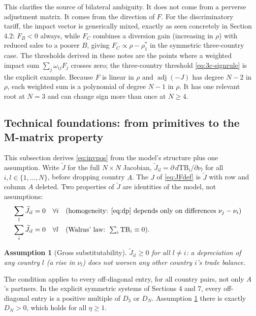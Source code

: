 \documentclass[11pt]{article}
\newtheorem{assumption}{Assumption}
\begin{document}
This clarifies the source of bilateral ambiguity. It does not come from a perverse adjustment matrix. It comes from the direction of $F$. For the discriminatory tariff, the impact vector is generically mixed, exactly as seen concretely in Section 4.2: $F_B < 0$ always, while $F_C$ combines a diversion gain (increasing in $\rho$) with reduced sales to a poorer $B$, giving $F_C \propto \rho - \rho_1^*$ in the symmetric three-country case. The thresholds derived in these notes are the points where a weighted impact sum $\sum_j \omega_{ij} F_j$ crosses zero; the three-country threshold \eqref{eq:3c-signrule} is the explicit example. Because $F$ is linear in $\rho$ and $\operatorname{adj}(-J)$ has degree $N-2$ in $\rho$, each weighted sum is a polynomial of degree $N-1$ in $\rho$. It has one relevant root at $N = 3$ and can change sign more than once at $N \geq 4$.

\subsection{Technical foundations: from primitives to the M-matrix property}

This subsection derives \eqref{eq:invpos} from the model's structure plus one assumption. Write $\widetilde J$ for the full $N \times N$ Jacobian, $\widetilde J_{il} = \partial\, d\mathrm{TB}_i / \partial \nu_l$ for all $i, l \in \{1, \dots, N\}$, before dropping country $A$. The $J$ of \eqref{eq:JFdef} is $\widetilde J$ with row and column $A$ deleted. Two properties of $\widetilde J$ are identities of the model, not assumptions:
\begin{align}
\sum_{l} \widetilde J_{il} &= 0 \quad \forall i
&& \text{(homogeneity: \eqref{eq:dp} depends only on differences } \nu_j - \nu_i)
\label{eq:hom}\\
\sum_{i} \widetilde J_{il} &= 0 \quad \forall l
&& \text{(Walras' law: } \textstyle\sum_i \mathrm{TB}_i \equiv 0) .
\label{eq:walras-col}
\end{align}

\begin{assumption}[Gross substitutability]
$\widetilde J_{il} \geq 0$ for all $l \neq i$: a depreciation of any country $l$ (a rise in $\nu_l$) does not worsen any other country $i$'s trade balance.
\label{as:gs}
\end{assumption}
\noindent The condition applies to every off-diagonal entry, for all country pairs, not only $A$'s partners. In the explicit symmetric systems of Sections 4 and 7, every off-diagonal entry is a positive multiple of $D_3$ or $D_N$. Assumption \ref{as:gs} there is exactly $D_N > 0$, which holds for all $\eta \geq 1$.
\end{document}
